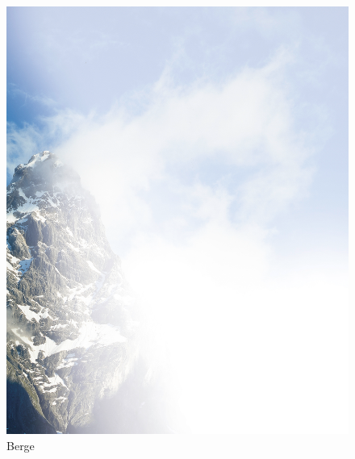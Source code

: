 \documentclass[ngerman,a4paper,11pt]{scrreprt}
\begin{document}
\begin{figure}[H]
\centering
\includegraphics[width=\textwidth,height=.8\textheight]{Bilder/Bilder/750_0010_13876_Hintergrund_Einklang_Todesanzeige.png}
\caption{Berge}
\end{figure}
\end{document}
